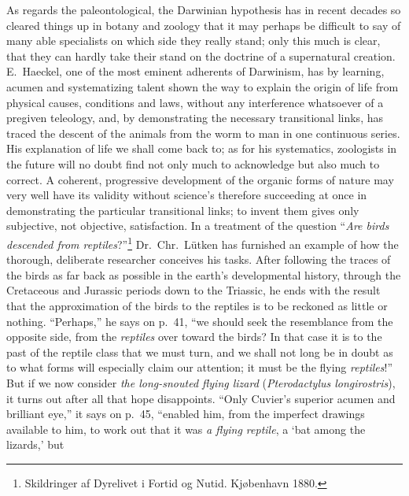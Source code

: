\documentclass[12pt,a4paper]{article}
\newcommand{\opage}[1]{\marginnote{\footnotesize\textit{[#1]}}}
\begin{document}
As regards the paleontological, the Darwinian hypothesis has in recent
decades so cleared things up in botany and zoology that it may perhaps
be difficult to say of many able specialists on which side they really
stand; only this much is clear, that they can hardly take their stand
on the doctrine of a supernatural creation. E.\ Haeckel, one of the
most eminent adherents of Darwinism, has by learning, acumen and
systematizing talent shown the way to explain the origin of life from
physical causes, conditions and laws, without any interference
whatsoever of a
\opage{38}pregiven teleology, and, by demonstrating the necessary
transitional links, has traced the descent of the animals from the
worm to man in one continuous series. His explanation of life we shall
come back to; as for his systematics, zoologists in the future will no
doubt find not only much to acknowledge but also much to correct. A
coherent, progressive development of the organic forms of nature may
very well have its validity without science's therefore succeeding at
once in demonstrating the particular transitional links; to invent
them gives only subjective, not objective, satisfaction. In a treatment
of the question ``\emph{Are birds descended from
reptiles}?''\footnote{Skildringer af Dyrelivet i Fortid og Nutid. Kjøbenhavn 1880.} %
Dr.\ Chr.\ Lütken has furnished an example of how the thorough,
deliberate researcher conceives his tasks. After following the traces
of the birds as far back as possible in the earth's developmental
history, through the Cretaceous and Jurassic periods down to the
Triassic, he ends with the result that the approximation of the birds
to the reptiles is to be reckoned as little or nothing. ``Perhaps,'' he
says on p.\ 41, ``we should seek the resemblance from the opposite
side, from the \emph{reptiles} over toward the birds? In that case it
is to the past of the reptile class that we must turn, and we shall
not long be in doubt as to what forms will especially claim our
attention; it must be the flying \emph{reptiles}!'' But if we now
consider \emph{the long-snouted flying lizard} (\textit{Pterodactylus
longirostris}), it turns out after all that hope disappoints. ``Only
Cuvier's superior acumen and brilliant eye,'' it says on p.\ 45,
``enabled him, from the imperfect drawings available to him, to work
out that it was \emph{a flying reptile}, a `bat among the lizards,' but
\end{document}
